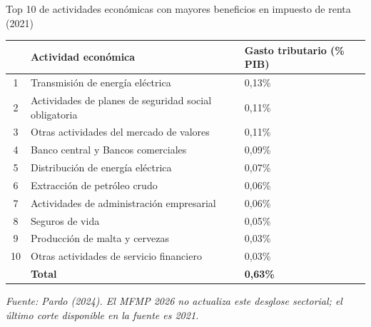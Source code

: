 \begin{frame}{Top 10 de actividades económicas con mayores beneficios en impuesto de renta (2021)}
\begin{table}[h!]
    \centering
    \begin{tabular}{|c|l|p{3.5cm}|}
        \hline
        & \textbf{Actividad económica} & \textbf{Gasto tributario} (\% PIB) \\
        \hline
        1  & Transmisión de energía eléctrica & 0,13\% \\
        2  & Actividades de planes de seguridad social obligatoria & 0,11\% \\
        3  & Otras actividades del mercado de valores & 0,11\% \\
        4  & Banco central y Bancos comerciales & 0,09\% \\
        5  & Distribución de energía eléctrica & 0,07\% \\
        6  & Extracción de petróleo crudo & 0,06\% \\
        7  & Actividades de administración empresarial & 0,06\% \\
        8  & Seguros de vida & 0,05\% \\
        9  & Producción de malta y cervezas & 0,03\% \\
        10 & Otras actividades de servicio financiero & 0,03\% \\
        \hline
        \textbf{} & \textbf{Total} & \textbf{0,63\%} \\  
        \hline
    \end{tabular}
    \vspace{0.2cm}
    \par\scriptsize\textit{Fuente: Pardo (2024). El MFMP 2026 no actualiza este desglose sectorial; el último corte disponible en la fuente es 2021.}
\end{table}
\end{frame}
